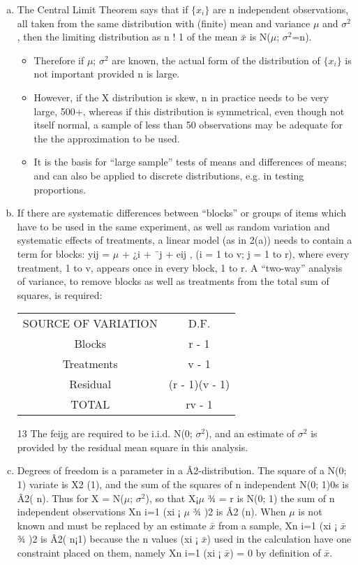 \documentclass[a4paper,12pt]{article}
\begin{document}
\begin{enumerate}[(a)]
\item  The Central Limit Theorem says that if $\{x_i\}$ are n independent observations,
all taken from the same distribution with (finite) mean and variance $\mu$ and
$\sigma^2$, then the limiting distribution as n ! 1 of the mean $\bar{x}$ is N($\mu$; $\sigma^2$=n).

\begin{itemize}
\item Therefore if $\mu$; $\sigma^2$ are known, the actual form of the distribution of $\{x_i\}$ is
not important provided n is large. 
\item However, if the X distribution is skew,
n in practice needs to be very large, 500+, whereas if this distribution is
symmetrical, even though not itself normal, a sample of less than 50 observations
may be adequate for the the approximation to be used.
\item It is the basis
for “large sample” tests of means and differences of means; and can also be
applied to discrete distributions, e.g. in testing proportions.
\end{itemize}

\item  If there are systematic differences between “blocks” or groups of items which
have to be used in the same experiment, as well as random variation and
systematic effects of treatments, a linear model (as in 2(a)) needs to contain
a term for blocks: yij = $\mu$ + ¿i + ¯j + eij , (i = 1 to v; j = 1 to r), where
every treatment, 1 to v, appears once in every block, 1 to r. A “two-way”
analysis of variance, to remove blocks as well as treatments from the total
sum of squares, is required:
\begin{center}
\begin{tabular}{|c|c|}
    SOURCE OF VARIATION&  D.F.\\
Blocks & r - 1\\
Treatments & v - 1\\
 Residual & (r - 1)(v - 1)\\
TOTAL & rv - 1\\
\end{tabular}
\end{center}

13
The feijg are required to be i.i.d. N(0; $\sigma^2$), and an estimate of $\sigma^2$ is provided
by the residual mean square in this analysis.
\item  Degrees of freedom is a parameter in a Â2-distribution. The square of a
N(0; 1) variate is X2
(1), and the sum of the squares of n independent N(0; 1)0s
is Â2(
n). Thus for X = N($\mu$; $\sigma^2$), so that X¡$\mu$
¾ = r is N(0; 1) the sum of n
independent observations
Xn
i=1
(xi ¡ $\mu$
¾
)2 is Â2
(n). When $\mu$ is not known and
must be replaced by an estimate $\bar{x}$ from a sample,
Xn
i=1
(xi ¡ $\bar{x}$
¾
)2 is Â2(
n¡1)
because the n values (xi ¡ $\bar{x}$) used in the calculation have one constraint
placed on them, namely
Xn
i=1
(xi ¡ $\bar{x}$) = 0 by definition of $\bar{x}$. 


\end{enumerate}
\end{document}
